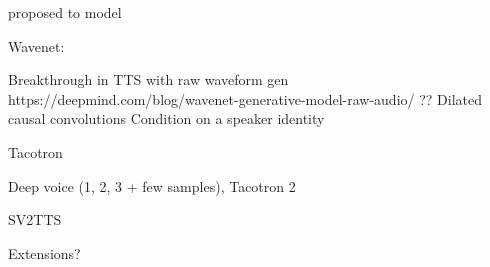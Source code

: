\documentclass[a4paper, oneside]{article}
\begin{document}
\cite{SPSSDNN} proposed to model

\color{red}




Wavenet:

\color{black}
Breakthrough in TTS with raw waveform gen
https://deepmind.com/blog/wavenet-generative-model-raw-audio/ ??
Dilated causal convolutions
Condition on a speaker identity
\color{red}

Tacotron

Deep voice (1, 2, 3 + few samples), Tacotron 2

SV2TTS

Extensions?
\color{black}



\color{red}
\color{black}

\clearpage

 




























\end{document}
